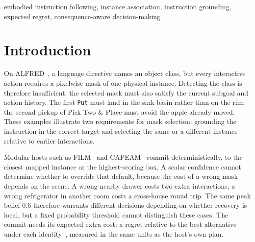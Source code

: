 \documentclass[conference]{IEEEtran}
\begin{document}
\begin{IEEEkeywords}
embodied instruction following, instance association, instruction grounding, expected regret, consequence-aware decision-making
\end{IEEEkeywords}

\section{Introduction}
On ALFRED~\cite{shridhar2020alfred}, a language directive names an object class, but every interactive action requires a pixelwise mask of one physical instance.
Detecting the class is therefore insufficient: the selected mask must also satisfy the current subgoal and action history.
The first \texttt{Put} must land in the sink basin rather than on the rim; the second pickup of Pick Two \& Place must avoid the apple already moved.
These examples illustrate two requirements for mask selection: grounding the instruction in the correct target and selecting the same or a different instance relative to earlier interactions.

Modular hosts such as FILM~\cite{min2022film} and CAPEAM~\cite{kim2023capeam} commit deterministically, to the closest mapped instance or the highest-scoring box.
A scalar confidence cannot determine whether to override that default, because the cost of a wrong mask depends on the scene.
A wrong nearby drawer costs two extra interactions; a wrong refrigerator in another room costs a cross-house round trip.
The same peak belief $0.6$ therefore warrants different decisions depending on whether recovery is local, but a fixed probability threshold cannot distinguish these cases.
The commit needs its expected extra cost: a regret relative to the best alternative under each identity~\cite{savage1951regret}, measured in the same units as the host's own plan.
\end{document}

